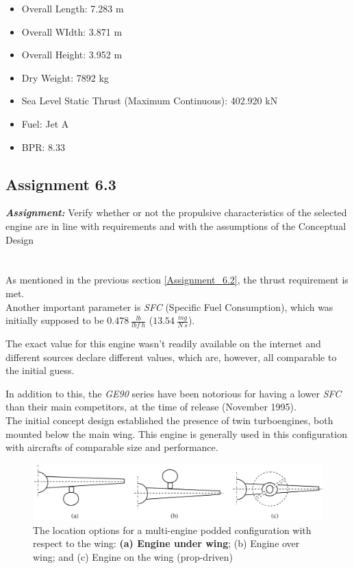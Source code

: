 \documentclass{article}
\begin{document}
\begin{itemize}
    \item Overall Length: 7.283 m
    \item Overall WIdth: 3.871 m
    \item Overall Height: 3.952 m
    \item Dry Weight: 7892 kg
    \item Sea Level Static Thrust (Maximum Continuous): 402.920 kN
    \item Fuel: Jet A
    \item BPR: 8.33
\end{itemize}

\clearpage



\subsection{Assignment 6.3\label{Assignment_6.3}}

\textbf{\textit{Assignment:}} Verify whether or not the propulsive characteristics of the selected 
engine are in line with requirements and with the assumptions of the Conceptual Design \\ \\ \\ 

As mentioned in the previous section \ref{Assignment_6.2}, the thrust requirement is met.\\

Another important parameter is \textit{SFC} (Specific Fuel Consumption), which was initially supposed to be 
$0.478 \ \frac{lb}{lbf \ h}$  ($13.54 \ \frac{mg}{N \ s}$). 

The exact value for this engine wasn't readily available on the internet and different sources
declare different values, which are, however, all comparable to the initial guess.

In addition to this, the \textit{GE90} series have been notorious for having a lower \textit{SFC} 
than their main competitors, at the time of release (November 1995).\\ 

The initial concept design established the presence of twin turboengines, both mounted below the main wing.
This engine is generally used in this configuration with aircrafts of comparable size and performance. \\ 

\begin{figure}[h!]
    \centering
    \includegraphics[width=\textwidth]{Sources/Plots_and_Pictures/engine_location.png}
    \caption{The location options for a multi-engine podded configuration with respect to the
    wing: \textbf{(a) Engine under wing}; (b) Engine over wing; and (c) Engine on the wing (prop-driven)}
    \label{engine_location}
\end{figure}
\end{document}
